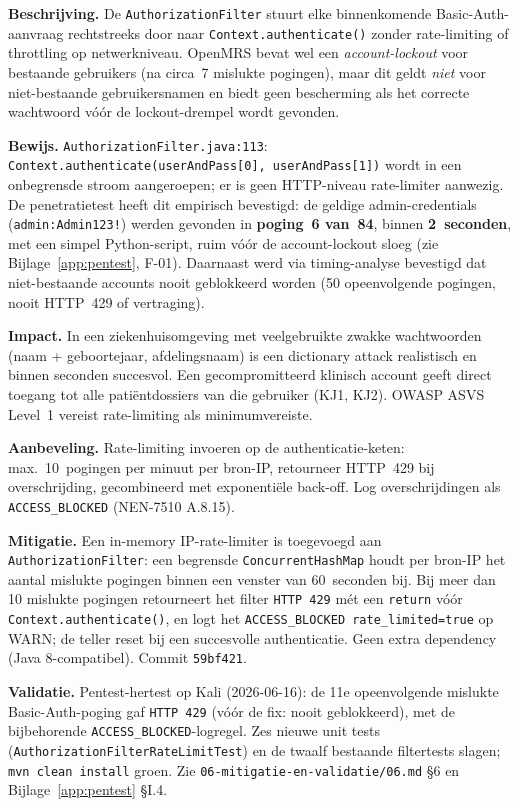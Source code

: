 \documentclass[12pt, a4paper]{report}
\begin{document}
\textbf{Beschrijving.} De \texttt{AuthorizationFilter} stuurt elke binnenkomende
Basic-Auth-aanvraag rechtstreeks door naar \texttt{Context.authenticate()} zonder
rate-limiting of throttling op netwerkniveau. OpenMRS bevat wel een
\emph{account-lockout} voor bestaande gebruikers (na circa~7 mislukte pogingen), maar
dit geldt \emph{niet} voor niet-bestaande gebruikersnamen en biedt geen bescherming
als het correcte wachtwoord vóór de lockout-drempel wordt gevonden.

\textbf{Bewijs.} \texttt{AuthorizationFilter.java:113}:
\texttt{Context.authenticate(userAndPass[0], userAndPass[1])} wordt in een onbegrensde
stroom aangeroepen; er is geen HTTP-niveau rate-limiter aanwezig. De penetratietest
heeft dit empirisch bevestigd: de geldige admin-credentials (\texttt{admin:Admin123!})
werden gevonden in \textbf{poging~6 van~84}, binnen \textbf{2~seconden}, met een
simpel Python-script, ruim vóór de account-lockout sloeg
(zie Bijlage~\ref{app:pentest}, F-01). Daarnaast werd via timing-analyse bevestigd
dat niet-bestaande accounts nooit geblokkeerd worden (50 opeenvolgende pogingen,
nooit HTTP~429 of vertraging).

\textbf{Impact.} In een ziekenhuisomgeving met veelgebruikte zwakke wachtwoorden
(naam + geboortejaar, afdelingsnaam) is een dictionary attack realistisch en binnen
seconden succesvol. Een gecompromitteerd klinisch account geeft direct toegang tot alle
patiëntdossiers van die gebruiker (KJ1, KJ2). OWASP ASVS Level~1 vereist
rate-limiting als minimumvereiste.

\textbf{Aanbeveling.} Rate-limiting invoeren op de authenticatie-keten:
max.~10~pogingen per minuut per bron-IP, retourneer HTTP~429 bij overschrijding,
gecombineerd met exponentiële back-off. Log overschrijdingen als
\texttt{ACCESS\_BLOCKED} (NEN-7510 A.8.15).

\textbf{Mitigatie.} Een in-memory IP-rate-limiter is toegevoegd aan
\texttt{AuthorizationFilter}: een begrensde \texttt{ConcurrentHashMap} houdt per
bron-IP het aantal mislukte pogingen binnen een venster van 60~seconden bij. Bij
meer dan 10 mislukte pogingen retourneert het filter \texttt{HTTP 429} mét een
\texttt{return} vóór \texttt{Context.authenticate()}, en logt het
\texttt{ACCESS\_BLOCKED rate\_limited=true} op WARN; de teller reset bij een
succesvolle authenticatie. Geen extra dependency (Java 8-compatibel). Commit
\texttt{59bf421}.

\textbf{Validatie.} Pentest-hertest op Kali (2026-06-16): de 11e opeenvolgende
mislukte Basic-Auth-poging gaf \texttt{HTTP 429} (vóór de fix: nooit geblokkeerd),
met de bijbehorende \texttt{ACCESS\_BLOCKED}-logregel. Zes nieuwe unit tests
(\texttt{AuthorizationFilterRateLimitTest}) en de twaalf bestaande
filtertests slagen; \texttt{mvn clean install} groen. Zie
\texttt{06-mitigatie-en-validatie/06.md} \S6 en Bijlage~\ref{app:pentest} \S I.4.
\end{document}
